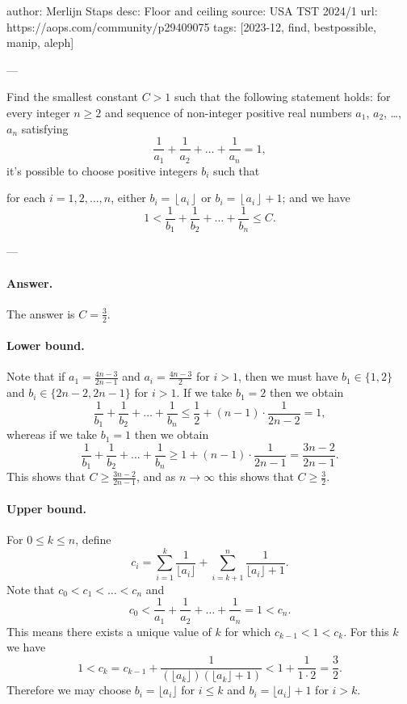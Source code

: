 author: Merlijn Staps
desc: Floor and ceiling
source: USA TST 2024/1
url: https://aops.com/community/p29409075
tags: [2023-12, find, bestpossible, manip, aleph]

---

Find the smallest constant $C > 1$ such that the following statement holds:
for every integer $n \ge 2$ and sequence of non-integer
positive real numbers $a_1$, $a_2$, \dots, $a_n$ satisfying
\[ \frac{1}{a_1} + \frac{1}{a_2} + \dots + \frac{1}{a_n} = 1, \]
it's possible to choose positive integers $b_i$ such that
\begin{enumerate}
  \ii[(i)] for each $i=1,2,\dots,n$,
  either $b_i = \left\lfloor a_i \right\rfloor$ or $b_i = \left\lfloor a_i \right\rfloor + 1$; and
  \ii[(ii)] we have
  \[ 1 < \frac1{b_1} + \frac1{b_2} + \dots + \frac{1}{b_n} \le C. \]
\end{enumerate}

---

\paragraph{Answer.} The answer is $C=\frac{3}{2}$.

\paragraph{Lower bound.}
Note that if $a_1 = \frac{4n-3}{2n-1}$ and $a_i = \frac{4n-3}{2}$ for $i > 1$,
then we must have $b_1 \in \{1,2\}$ and $b_i \in \{2n-2,2n-1\}$ for $i > 1$. If
we take $b_1 = 2$ then we obtain
\[
  \frac{1}{b_1} + \frac{1}{b_2} + \dots + \frac{1}{b_n} \le \frac{1}{2} + (n-1)
  \cdot \frac{1}{2n-2} = 1,
\]
whereas if we take $b_1 = 1$ then we obtain
\[
  \frac{1}{b_1} + \frac{1}{b_2} + \dots + \frac{1}{b_n}  \ge 1 + (n-1) \cdot
  \frac{1}{2n-1} = \frac{3n-2}{2n-1}.
\]
This shows that $C \ge \frac{3n-2}{2n-1}$, and as $n\to \infty$ this shows that
$C\geq \frac{3}{2}$.

\paragraph{Upper bound.}
For $0\leq k\leq n$, define
\[
  c_i = \sum_{i=1}^{k}\frac{1}{\lfloor a_i\rfloor}
  + \sum_{i=k+1}^{n}\frac{1}{\lfloor a_i\rfloor+1}.
\]
Note that $c_0 < c_1 < \dots < c_n$ and
\[c_0 < \frac{1}{a_1} + \frac{1}{a_2} + \dots + \frac{1}{a_n} = 1 < c_n.\]
This means there exists a unique value of $k$ for which $c_{k-1} < 1 < c_{k}$. For
this $k$ we have
\[
  1 < c_{k} = c_{k-1} + \frac{1}{(\lfloor a_k\rfloor)(\lfloor a_k\rfloor+1)} < 1 +
  \frac{1}{1\cdot 2} = \frac{3}{2}.
\]
Therefore we may choose $b_i = \lfloor a_i\rfloor$ for $i\leq k$ and $b_i =
\lfloor a_i\rfloor+1$ for $i > k$.

